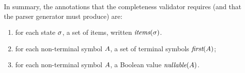 \documentclass{llncs}
\begin{document}


In summary, the annotations that the completeness validator requires (and that
the parser generator must produce) are:
\begin{enumerate}
\item for each state $\sigma$, a set of items, written $\textit{items}(\sigma)$.
\item for each non-terminal symbol $A$, a set of terminal symbols $\textit{first}(A)$;
\item for each non-terminal symbol $A$, a Boolean value $\textit{nullable}(A)$.
\end{enumerate}


\end{document}

